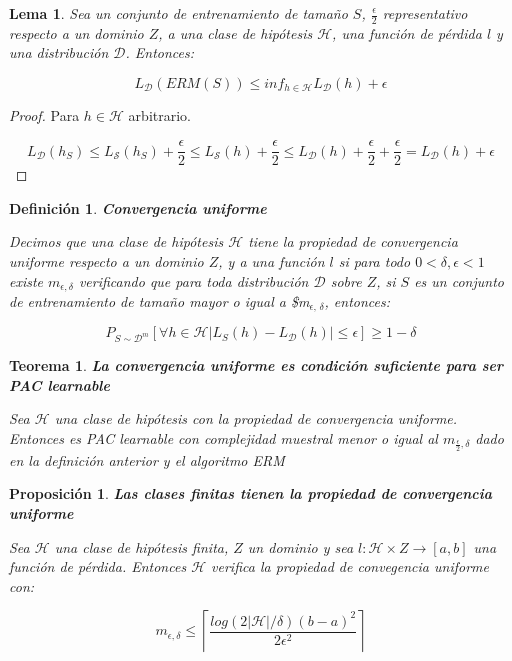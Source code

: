 \documentclass[11pt]{article}
\newtheorem{theorem}{Teorema}
\newtheorem{fact}{Proposición}
\newtheorem{lemma}{Lema}
\newtheorem{definition}{Definición}
\begin{document}
\begin{lemma}
Sea un conjunto de entrenamiento de tamaño $S$, $\frac{\epsilon}{2}$ representativo respecto a un dominio $Z$, a una clase de hipótesis $\mathcal{H}$, una función de pérdida $l$ y una distribución $\mathcal{D}$. Entonces:

\[L_{\mathcal{D}} (ERM(S)) \le inf_{h\in \mathcal{H}} L_{\mathcal{D}}(h) + \epsilon\]
\end{lemma}

\begin{proof}
Para $h \in \mathcal{H}$ arbitrario.

\[L_{\mathcal{D}}(h_S) \le L_{\mathcal{S}}(h_S) + \frac{\epsilon}{2} \le L_{\mathcal{S}}(h) + \frac{\epsilon}{2} \le L_{\mathcal{D}}(h) + \frac{\epsilon}{2} + \frac{\epsilon}{2} =  L_{\mathcal{D}}(h) + \epsilon\]
\end{proof}

\begin{definition}
\textbf{Convergencia uniforme}

Decimos que una clase de hipótesis $\mathcal{H}$ tiene la propiedad de convergencia uniforme respecto a un dominio $Z$, y a una función $l$ si para todo $0 < \delta, \epsilon < 1$ existe $m_{\epsilon, \delta}$ verificando que para toda distribución $\mathcal{D}$ sobre $Z$, si $S$ es un conjunto de entrenamiento de tamaño mayor o igual a \$m$_{\epsilon\text{, }\delta}$, entonces:

\[P_{S\sim \mathcal{D}^m} [\forall h\in \mathcal{H} |L_S(h) - L_{\mathcal{D}}(h)| \le \epsilon] \ge 1-\delta\]
\end{definition}


\begin{theorem}
\textbf{La convergencia uniforme es condición suficiente para ser PAC learnable}

Sea $\mathcal{H}$ una clase de hipótesis con la propiedad de convergencia uniforme. Entonces es PAC learnable con complejidad muestral menor o igual al $m_{\frac{\epsilon}{2}, \delta}$ dado en la definición anterior y el algoritmo ERM
\end{theorem}

\begin{fact}
\textbf{Las clases finitas tienen la propiedad de convergencia uniforme}

Sea $\mathcal{H}$ una clase de hipótesis finita, $Z$ un dominio y sea $l : \mathcal{H} \times Z \rightarrow [a,b]$ una función de pérdida. Entonces $\mathcal{H}$ verifica la propiedad de convegencia uniforme con: 

\[m_{\epsilon, \delta} \le \left\lceil \frac{log(2|\mathcal{H}|/\delta)(b-a)^2}{2\epsilon^2} \right\rceil\]
\end{fact}
\end{document}
